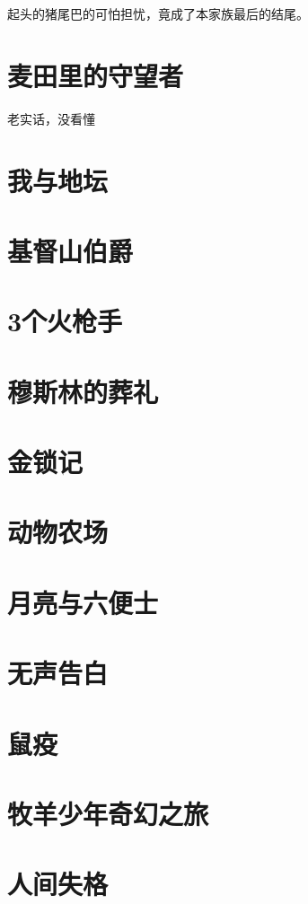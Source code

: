 \documentclass[UTF8,a4paper,12pt]{ctexbook}
\begin{document}
		起头的猪尾巴的可怕担忧，竟成了本家族最后的结尾。
		
	\section{麦田里的守望者}
		老实话，没看懂
		
	\section{我与地坛}
	
	\section{基督山伯爵}
	
	\section{3个火枪手}	
	
	\section{穆斯林的葬礼}
	
	\section{金锁记}
	
	\section{动物农场}
	
	\section{月亮与六便士}
	
	\section{无声告白}
	
	\section{鼠疫}
	
	\section{牧羊少年奇幻之旅}
	
	\section{人间失格}
	
\end{document}
